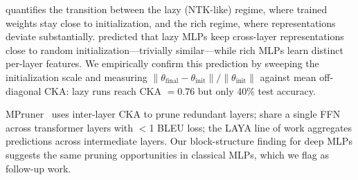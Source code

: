  \citet{chizat2019global} quantifies the transition between the lazy (NTK-like) regime, where trained weights stay close to initialization, and the rich regime, where representations deviate substantially. \citet{tong2025richness} predicted that lazy MLPs keep cross-layer representations close to random initialization---trivially similar---while rich MLPs learn distinct per-layer features. We empirically confirm this prediction by sweeping the initialization scale and measuring $\|\theta_{\mathrm{final}} - \theta_{\mathrm{init}}\|/\|\theta_{\mathrm{init}}\|$ against mean off-diagonal CKA: lazy runs reach CKA $= 0.76$ but only 40\% test accuracy.

 MPruner~\citep{park2024mpruner} uses inter-layer CKA to prune redundant layers; \citet{pessoa2023onewide} share a single FFN across transformer layers with $<$1 BLEU loss; the LAYA line of work aggregates predictions across intermediate layers. Our block-structure finding for deep MLPs suggests the same pruning opportunities in classical MLPs, which we flag as follow-up work.
